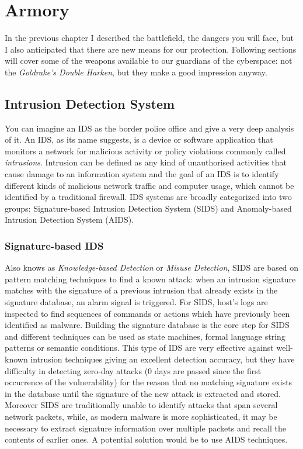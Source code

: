 \chapter{Armory}
In the previous chapter I described the battlefield, the dangers you will face, but I also anticipated that there are new means for our protection. Following sections will cover some of the weapons available to our guardians of the cyberspace: not the \textit{Goldrake's Double Harken}, but they make a good impression anyway. 
\section{Intrusion Detection System}
You can imagine an IDS as the border police office and \cite{Khraisat2019} give a very deep analysis of it. An IDS, as its name suggests, is a device or software application that monitors a network for malicious activity or policy violations commonly called \textit{intrusions}. Intrusion can be defined as any kind of unauthorised activities that cause damage to an information system and the goal of an IDS is to identify different kinds of malicious network traffic and computer usage, which cannot be identified by a traditional firewall. IDS systems are broadly categorized into two groups: Signature-based Intrusion Detection System (SIDS) and Anomaly-based Intrusion Detection System (AIDS).
\subsection{Signature-based IDS}
Also knows as \textit{Knowledge-based Detection} or \textit{Misuse Detection}, SIDS  are based on pattern matching techniques to find a known attack: when an intrusion signature matches with the signature of a previous intrusion that already exists in the signature database, an alarm signal is triggered. For SIDS, host’s logs are inspected to find sequences of commands or actions which have previously been identified as malware. Building the signature database is the core step for SIDS and different techniques can be used as state machines, formal language string patterns or semantic conditions. This type of IDS are very effective against well-known intrusion techniques giving an excellent detection accuracy, but they have difficulty in detecting zero-day attacks (0 days are passed since the first occurrence of the vulnerability) for the reason that no matching signature exists in the database until the signature of the new attack is extracted and stored. Moreover SIDS are traditionally unable to identify attacks that span several network packets, while, as modern malware is more sophisticated, it may be necessary to extract signature information over multiple packets and recall the contents of earlier ones. A potential solution would be to use AIDS techniques.
